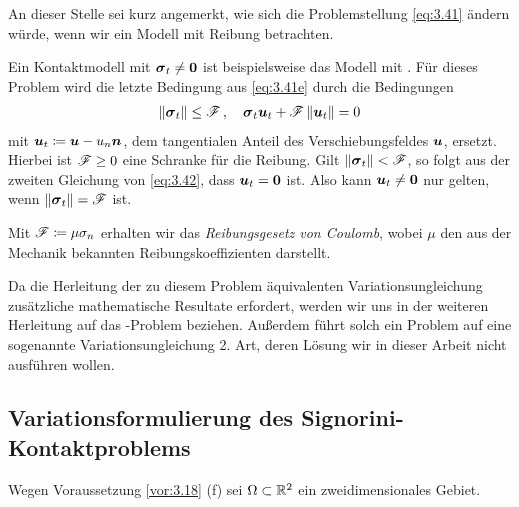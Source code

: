An dieser Stelle sei kurz angemerkt, wie sich die Problemstellung \eqref{eq:3.41} ändern würde, wenn wir ein Modell mit Reibung betrachten.

\begin{bem}\label{bem:3.20}
Ein Kontaktmodell mit $\boldsymbol \sigma_t \not = \boldsymbol 0$ ist beispielsweise das Modell mit \textit{}. Für dieses Problem wird die letzte Bedingung aus \eqref{eq:3.41e} durch die Bedingungen
\begin{align}\label{eq:3.42}
	\lVert \boldsymbol \sigma_t\rVert \le \mathscr F \, , \quad \boldsymbol \sigma_t \boldsymbol u_t + \mathscr F\,  \lVert \boldsymbol u_t\rVert = 0
\end{align}
mit $\boldsymbol u_t \coloneqq \boldsymbol u - u_n \boldsymbol n$, dem tangentialen Anteil des Verschiebungsfeldes $\boldsymbol u$, ersetzt. Hierbei ist $\mathscr F \ge 0$ eine Schranke für die Reibung. Gilt $\lVert \boldsymbol \sigma_t\rVert < \mathscr F$, so folgt aus der zweiten Gleichung von \eqref{eq:3.42}, dass $\boldsymbol u_t = \boldsymbol 0$ ist. Also kann $\boldsymbol u_t \not=\boldsymbol 0$ nur gelten, wenn $\lVert \boldsymbol \sigma_t\rVert = \mathscr F$ ist.

Mit $\mathscr F \coloneqq \mu \sigma_n$ erhalten wir das \textit{Reibungsgesetz von Coulomb}, wobei $\mu$ den aus der Mechanik bekannten Reibungskoeffizienten darstellt.

Da die Herleitung der zu diesem Problem äquivalenten Variationsungleichung zusätzliche mathematische Resultate erfordert, werden wir uns in der weiteren Herleitung auf das -Problem beziehen. Außerdem führt solch ein Problem auf eine sogenannte Variationsungleichung 2. Art, deren Lösung wir in dieser Arbeit nicht ausführen wollen.
\end{bem}





\subsection{Variationsformulierung des Signorini-Kontaktproblems}
\label{kap:3.2.2}

\begin{erinnerung}
Wegen Voraussetzung \ref{vor:3.18} (f) sei $\Omega \subset \mathbb{R}^2$ ein zweidimensionales Gebiet.
\end{erinnerung}


